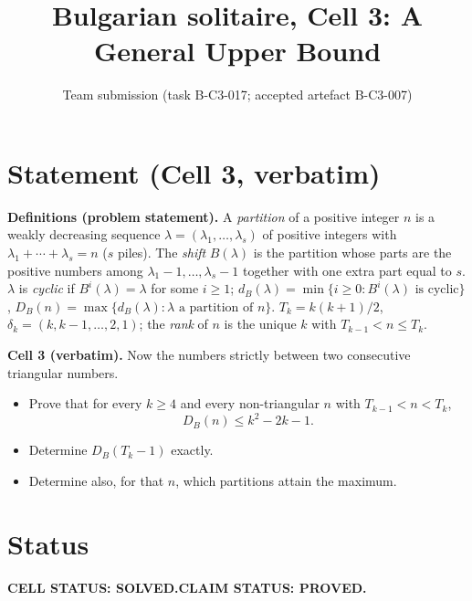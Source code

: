 \documentclass[11pt]{article}
\title{Bulgarian solitaire, Cell 3: A General Upper Bound}
\author{Team submission (task B-C3-017; accepted artefact B-C3-007)}
\date{}
\begin{document}
\maketitle

\section*{Statement (Cell 3, verbatim)}

\textbf{Definitions (problem statement).} A \emph{partition} of a positive integer $n$ is a weakly decreasing sequence $\lambda=(\lambda_1,\ldots,\lambda_s)$ of positive integers with $\lambda_1+\cdots+\lambda_s=n$ ($s$ piles). The \emph{shift} $B(\lambda)$ is the partition whose parts are the positive numbers among $\lambda_1-1,\ldots,\lambda_s-1$ together with one extra part equal to $s$. $\lambda$ is \emph{cyclic} if $B^i(\lambda)=\lambda$ for some $i\ge 1$;
$d_B(\lambda)=\min\{i\ge 0: B^i(\lambda)\text{ is cyclic}\}$, $D_B(n)=\max\{d_B(\lambda):\lambda\text{ a partition of } n\}$.
$T_k=k(k+1)/2$, $\delta_k=(k,k-1,\ldots,2,1)$; the \emph{rank} of $n$ is the unique $k$ with $T_{k-1}<n\le T_k$.

\textbf{Cell 3 (verbatim).} Now the numbers strictly between two consecutive triangular numbers.
\begin{itemize}
\item[(a)] Prove that for every $k\ge 4$ and every non-triangular $n$ with $T_{k-1}<n<T_k$,
\[ D_B(n)\le k^2-2k-1. \]
\item[(b)] Determine $D_B(T_k-1)$ exactly.
\item[(c)] Determine also, for that $n$, which partitions attain the maximum.
\end{itemize}

\section*{Status}
\textbf{CELL STATUS: SOLVED.}\qquad \textbf{CLAIM STATUS: PROVED.}
\end{document}
